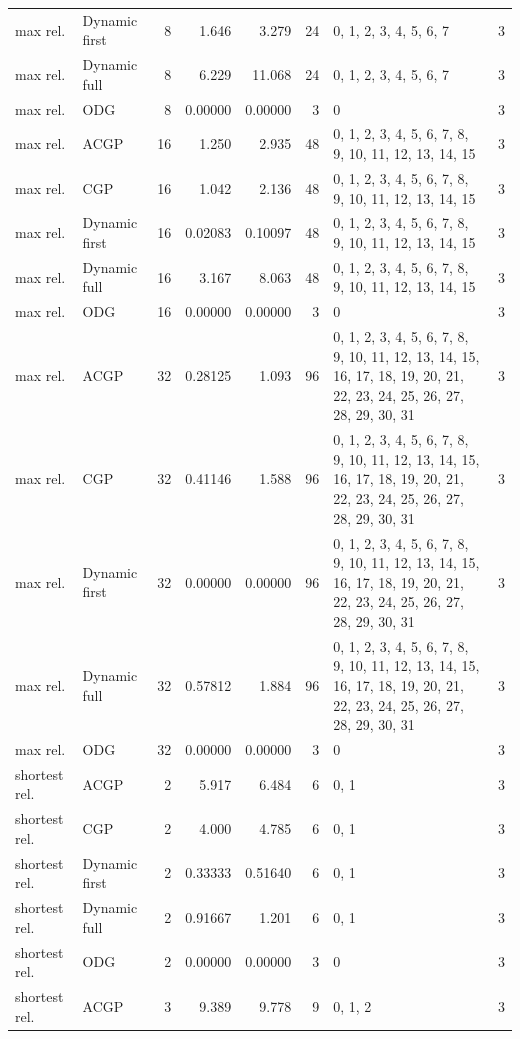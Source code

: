\documentclass[10pt,a4paper]{article}
\begin{document}
\begin{longtable}{@{}p{23mm}p{29mm}rrrrp{36mm}r@{}}
max rel. & Dynamic first & 8 & 1.646 & 3.279 & 24 & 0, 1, 2, 3, 4, 5, 6, 7 & 3 \\
max rel. & Dynamic full & 8 & 6.229 & 11.068 & 24 & 0, 1, 2, 3, 4, 5, 6, 7 & 3 \\
max rel. & ODG & 8 & 0.00000 & 0.00000 & 3 & 0 & 3 \\
max rel. & ACGP & 16 & 1.250 & 2.935 & 48 & 0, 1, 2, 3, 4, 5, 6, 7, 8, 9, 10, 11, 12, 13, 14, 15 & 3 \\
max rel. & CGP & 16 & 1.042 & 2.136 & 48 & 0, 1, 2, 3, 4, 5, 6, 7, 8, 9, 10, 11, 12, 13, 14, 15 & 3 \\
max rel. & Dynamic first & 16 & 0.02083 & 0.10097 & 48 & 0, 1, 2, 3, 4, 5, 6, 7, 8, 9, 10, 11, 12, 13, 14, 15 & 3 \\
max rel. & Dynamic full & 16 & 3.167 & 8.063 & 48 & 0, 1, 2, 3, 4, 5, 6, 7, 8, 9, 10, 11, 12, 13, 14, 15 & 3 \\
max rel. & ODG & 16 & 0.00000 & 0.00000 & 3 & 0 & 3 \\
max rel. & ACGP & 32 & 0.28125 & 1.093 & 96 & 0, 1, 2, 3, 4, 5, 6, 7, 8, 9, 10, 11, 12, 13, 14, 15, 16, 17, 18, 19, 20, 21, 22, 23, 24, 25, 26, 27, 28, 29, 30, 31 & 3 \\
max rel. & CGP & 32 & 0.41146 & 1.588 & 96 & 0, 1, 2, 3, 4, 5, 6, 7, 8, 9, 10, 11, 12, 13, 14, 15, 16, 17, 18, 19, 20, 21, 22, 23, 24, 25, 26, 27, 28, 29, 30, 31 & 3 \\
max rel. & Dynamic first & 32 & 0.00000 & 0.00000 & 96 & 0, 1, 2, 3, 4, 5, 6, 7, 8, 9, 10, 11, 12, 13, 14, 15, 16, 17, 18, 19, 20, 21, 22, 23, 24, 25, 26, 27, 28, 29, 30, 31 & 3 \\
max rel. & Dynamic full & 32 & 0.57812 & 1.884 & 96 & 0, 1, 2, 3, 4, 5, 6, 7, 8, 9, 10, 11, 12, 13, 14, 15, 16, 17, 18, 19, 20, 21, 22, 23, 24, 25, 26, 27, 28, 29, 30, 31 & 3 \\
max rel. & ODG & 32 & 0.00000 & 0.00000 & 3 & 0 & 3 \\
shortest rel. & ACGP & 2 & 5.917 & 6.484 & 6 & 0, 1 & 3 \\
shortest rel. & CGP & 2 & 4.000 & 4.785 & 6 & 0, 1 & 3 \\
shortest rel. & Dynamic first & 2 & 0.33333 & 0.51640 & 6 & 0, 1 & 3 \\
shortest rel. & Dynamic full & 2 & 0.91667 & 1.201 & 6 & 0, 1 & 3 \\
shortest rel. & ODG & 2 & 0.00000 & 0.00000 & 3 & 0 & 3 \\
shortest rel. & ACGP & 3 & 9.389 & 9.778 & 9 & 0, 1, 2 & 3 \\

\end{longtable}
\end{document}
